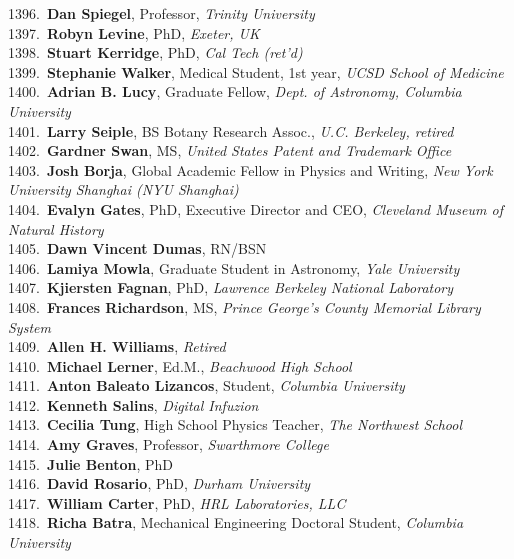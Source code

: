 1396.~{\bf Dan Spiegel}, Professor, {\sl Trinity University} \\
1397.~{\bf Robyn Levine}, PhD, {\sl Exeter, UK} \\
1398.~{\bf Stuart Kerridge}, PhD, {\sl Cal Tech (ret'd)} \\
1399.~{\bf Stephanie Walker}, Medical Student, 1st year, {\sl UCSD School of Medicine} \\
1400.~{\bf Adrian B. Lucy}, Graduate Fellow, {\sl Dept. of Astronomy, Columbia University} \\
1401.~{\bf Larry Seiple}, BS Botany Research Assoc., {\sl U.C. Berkeley, retired} \\
1402.~{\bf Gardner Swan}, MS, {\sl United States Patent and Trademark Office} \\
1403.~{\bf Josh Borja}, Global Academic Fellow in Physics and Writing, {\sl New York University Shanghai (NYU Shanghai)} \\
1404.~{\bf Evalyn Gates}, PhD, Executive Director and CEO, {\sl Cleveland Museum of Natural History} \\
1405.~{\bf Dawn Vincent Dumas}, RN/BSN \\
1406.~{\bf Lamiya Mowla}, Graduate Student in Astronomy, {\sl Yale University} \\
1407.~{\bf Kjiersten Fagnan}, PhD, {\sl Lawrence Berkeley National Laboratory} \\
1408.~{\bf Frances Richardson}, MS, {\sl Prince George's County Memorial Library System} \\
1409.~{\bf Allen H. Williams}, {\sl Retired} \\
1410.~{\bf Michael Lerner}, Ed.M., {\sl Beachwood High School} \\
1411.~{\bf Anton Baleato Lizancos}, Student, {\sl Columbia University} \\
1412.~{\bf Kenneth Salins}, {\sl Digital Infuzion} \\
1413.~{\bf Cecilia Tung}, High School Physics Teacher, {\sl The Northwest School} \\
1414.~{\bf Amy Graves}, Professor, {\sl Swarthmore College} \\
1415.~{\bf Julie Benton}, PhD \\
1416.~{\bf David Rosario}, PhD, {\sl Durham University} \\
1417.~{\bf William Carter}, PhD, {\sl HRL Laboratories, LLC} \\
1418.~{\bf Richa Batra}, Mechanical Engineering Doctoral Student, {\sl Columbia University} \\

